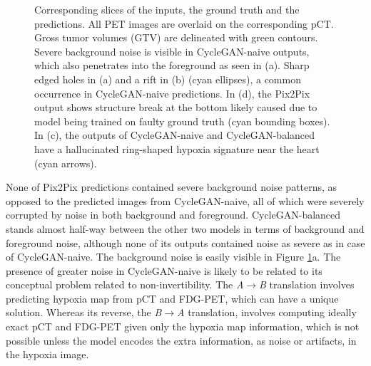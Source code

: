 \begin{figure}
    \centering
    \caption{Corresponding slices of the inputs, the ground truth and the predictions. All PET images are overlaid on the corresponding pCT. Gross tumor volumes (GTV) are delineated with green contours. Severe background noise is visible in CycleGAN-naive outputs, which also penetrates into the foreground as seen in (a). Sharp edged holes in (a) and a rift in (b) (cyan ellipses), a common occurrence in CycleGAN-naive predictions. In (d), the Pix2Pix output shows structure break at the bottom likely caused due to model being trained on faulty ground truth (cyan bounding boxes). In (c), the outputs of CycleGAN-naive and CycleGAN-balanced have a hallucinated ring-shaped hypoxia signature near the heart (cyan arrows).}
    \label{fig:hx4_image_quality_inspection_viz}
\end{figure}

None of Pix2Pix predictions contained severe background noise patterns, as opposed to the predicted images from CycleGAN-naive, all of which were severely corrupted by noise in both background and foreground. CycleGAN-balanced stands almost half-way between the other two models in terms of background and foreground noise, although none of its outputs contained noise as severe as in case of CycleGAN-naive. The background noise is easily visible in Figure \ref{fig:hx4_image_quality_inspection_viz}a. The presence of greater noise in CycleGAN-naive is likely to be related to its conceptual problem related to non-invertibility. The \textit{A}$\rightarrow$\textit{B} translation involves predicting hypoxia map from pCT and FDG-PET, which can have a unique solution. Whereas its reverse, the \textit{B}$\rightarrow$\textit{A} translation, involves computing ideally exact pCT and FDG-PET given only the hypoxia map information, which is not possible unless the model encodes the extra information, as noise or artifacts, in the hypoxia image.

